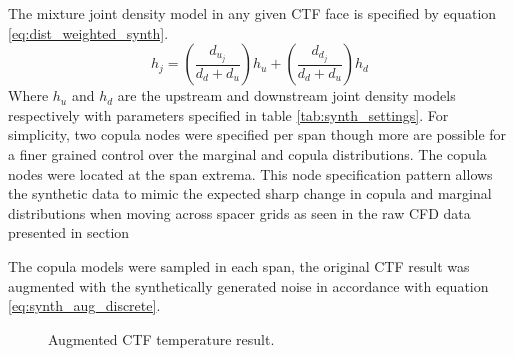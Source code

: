The mixture joint density model in any given CTF face is specified by equation \ref{eq:dist_weighted_synth}.
\begin{equation}
    h_j = \left( \frac{d_{u_j}}{d_{d} + d_{u}} \right) h_u +
    \left( \frac{d_{d_j}}{d_{d} + d_{u}} \right) h_d
    \label{eq:dist_weighted_synth}
\end{equation}
Where $h_u$ and $h_d$ are the upstream and downstream joint density models respectively with parameters specified in table \ref{tab:synth_settings}.
For simplicity, two copula nodes were specified per span though more are possible for a finer grained control over the marginal and copula distributions.    The copula nodes were located at the span extrema. This node specification pattern allows the synthetic data to mimic the expected sharp change in copula and marginal distributions when moving across spacer grids as seen in the raw CFD data presented in section%

The copula models were sampled in each span, the original CTF result was augmented with the synthetically generated noise in accordance with equation \ref{eq:synth_aug_discrete}.

\begin{figure}[H]%
    \centering
    \hspace*{-1.0em}%
    \caption[Augmented CFD result.]{Augmented CTF temperature result.}%
    \label{fig:ctf_twall_aug}%
\end{figure}

